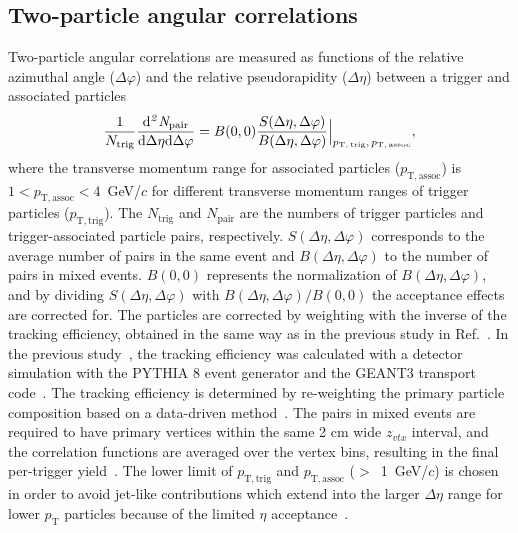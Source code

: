 \subsection{Two-particle angular correlations}
Two-particle angular correlations are measured as functions of the relative azimuthal angle ($\Delta\varphi$) and the relative pseudorapidity ($\Delta\eta$) between a trigger and associated particles
\begin{eqnarray}
\frac{1}{N_{\rm{trig}}} \frac{ \rm{d}\it{}^{2} N_{\rm{pair}} }{ \rm{d} \Delta\eta \rm{d}\Delta\varphi} = B(0, 0)\frac{S(\Delta\eta, \Delta\varphi)}{B(\Delta\eta, \Delta\varphi)}  \Big\lvert_{p_\mathrm{T,\,trig},\,p_\mathrm{T,\,assoc}},
\label{eq:corrfunction}
\end{eqnarray}
where the transverse momentum range for associated particles ($p_\mathrm{T,assoc}$) is $1<p_\mathrm{T,assoc}<4$~GeV/$c$ for different transverse momentum ranges of trigger particles ($p_\mathrm{T,trig}$).
The $N_\mathrm{trig}$ and $N_\mathrm{pair}$ are the numbers of trigger particles and trigger-associated particle pairs, respectively. $S(\Delta\eta, \Delta\varphi)$ corresponds to the average number of pairs in the same event and $B(\Delta\eta, \Delta\varphi)$ to the number of pairs in mixed events. 
$B (0,0)$ represents the normalization of $B(\Delta\eta, \Delta\varphi)$, and by dividing $S(\Delta\eta, \Delta\varphi)$ with $B(\Delta\eta, \Delta\varphi)/B (0,0)$ the acceptance effects are corrected for. The particles are corrected by weighting with the inverse of the tracking efficiency, obtained in the same way as in the previous study in Ref.~\cite{ALICE:2021nir}.
In the previous study~\cite{ALICE:2021nir}, the tracking efficiency was calculated with a detector simulation with the PYTHIA 8 event generator and the GEANT3 transport code~\cite{Brun:1994aa}. The tracking efficiency is determined by re-weighting the primary particle composition based on a data-driven method~\cite{ALICE:2018hza,ALICE:2018vuu}. 
The pairs in mixed events are required to have primary vertices within the same 2 cm wide $z_{vtx}$ interval, and the correlation functions are averaged over the vertex bins, resulting in the final per-trigger yield~\cite{KOPYLOV1974472:evtmixing,Adam:2016tsv}. The lower limit of $p_\mathrm{T,trig}$ and $p_\mathrm{T,assoc}$ ($>$~1~GeV/$c$) is chosen in order to avoid jet-like contributions which extend into the larger $\Delta\eta$ range for lower $p_\mathrm{T}$ particles because of the limited $\eta$ acceptance~\cite{ALICE:2021nir}. 

